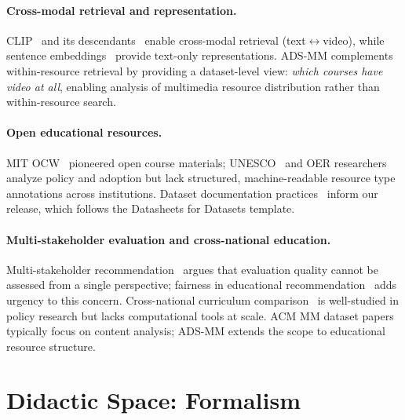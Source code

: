 \documentclass[sigconf,review]{acmart}
\newcommand{\ADSMM}{\textsc{ADS-MM}\xspace}
\begin{document}
\paragraph{Cross-modal retrieval and representation.}
CLIP~\cite{radford2021clip} and its descendants~\cite{luo2022clip4clip,clip2tf2024} enable cross-modal retrieval (text$\leftrightarrow$video), while sentence embeddings~\cite{reimers2019sentencebert,wang2020minilm,devlin2019bert} provide text-only representations.
\ADSMM complements within-resource retrieval by providing a dataset-level view: \emph{which courses have video at all}, enabling analysis of multimedia resource distribution rather than within-resource search.

\paragraph{Open educational resources.}
MIT OCW~\cite{mitocw2001} pioneered open course materials; UNESCO~\cite{unesco2019oer} and OER researchers~\cite{wiley2014oerdefinition,tlili2023oerreview} analyze policy and adoption but lack structured, machine-readable resource type annotations across institutions.
Dataset documentation practices~\cite{gebru2021datasheets,bender2018datasheets} inform our release, which follows the Datasheets for Datasets template.

\paragraph{Multi-stakeholder evaluation and cross-national education.}
Multi-stakeholder recommendation~\cite{abdollahpouri2020multistakeholder,burke2017multistakeholder} argues that evaluation quality cannot be assessed from a single perspective; fairness in educational recommendation~\cite{ekstrand2019fairness,baker2019challenges} adds urgency to this concern.
Cross-national curriculum comparison~\cite{oecd2023education,marginson2022global} is well-studied in policy research but lacks computational tools at scale.
ACM MM dataset papers~\cite{multihateclip2024,synopground2024,dfbench2025,emoart2025} typically focus on content analysis; \ADSMM extends the scope to educational resource structure.




\section{Didactic Space: Formalism}
\label{sec:formalism}
\end{document}
